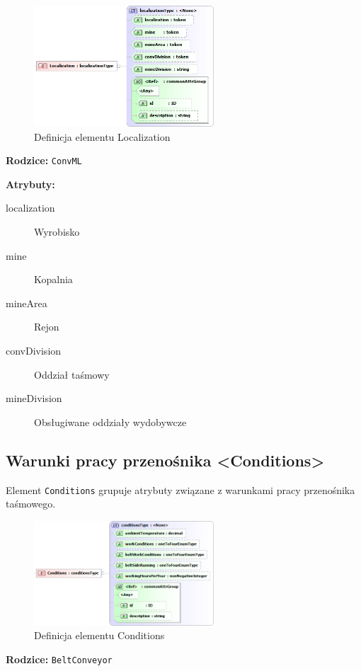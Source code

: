 \documentclass[12pt,a4paper]{article}
\begin{document}
\begin{figure}[H]
  \centering
  \includegraphics[width=0.6\textwidth]{png/liquid/Localization}
  \caption{Definicja elementu Localization}
  \label{fig:localization-xsd}
\end{figure}

\noindent\textbf{Rodzice:} \texttt{ConvML}

\noindent\textbf{Atrybuty:}
\begin{description}
\item[localization] Wyrobisko
\item[mine] Kopalnia
\item[mineArea] Rejon
\item[convDivision] Oddział taśmowy
\item[mineDivision] Obsługiwane oddziały wydobywcze
\end{description}


\subsection{Warunki pracy przenośnika <Conditions>}
Element {\tt Conditions} grupuje atrybuty związane z warunkami pracy przenośnika
taśmowego.

\begin{figure}[H]
  \centering
  \includegraphics[width=0.6\textwidth]{png/liquid/Conditions}
  \caption{Definicja elementu Conditions}
  \label{fig:conditions-xsd}
\end{figure}

\noindent\textbf{Rodzice:} \texttt{BeltConveyor}
\end{document}
